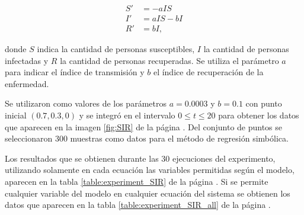 \begin{align*}
    S' & = - aIS    \\
    I' & = aIS - bI \\
    R' & = bI,
\end{align*}

donde $S$ indica la cantidad de personas susceptibles, $I$ la cantidad de personas infectadas y $R$ la cantidad de personas recuperadas. Se utiliza el parámetro $a$ para indicar el índice de transmisión y $b$ el índice de recuperación de la enfermedad.

Se utilizaron como valores de los parámetros $a = 0.0003$ y $b = 0.1$ con punto inicial $(0.7, 0.3, 0)$ y se integró en el intervalo $0 \leq t \leq 20$ para obtener los datos que aparecen en la imagen \ref{fig:SIR} de la página \pageref{fig:SIR}. Del conjunto de puntos se seleccionaron 300 muestras como datos para el método de regresión simbólica.

Los resultados que se obtienen durante las 30 ejecuciones del experimento, utilizando solamente en cada ecuación las variables permitidas según el modelo, aparecen en la tabla \ref{table:experiment_SIR} de la página \pageref{table:experiment_SIR}. Si se permite cualquier variable del modelo en cualquier ecuación del sistema se obtienen los datos que aparecen en la tabla \ref{table:experiment_SIR_all} de la página \pageref{table:experiment_SIR_all}.

